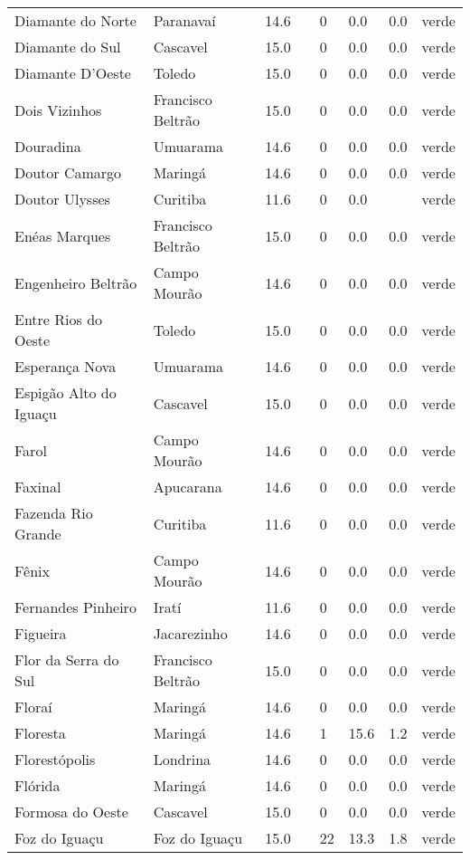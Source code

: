 \begin{longtable}{l|lllllll}
  Diamante do Norte & Paranavaí & 14.6 &  & 0 & 0.0 & 0.0 & verde \\ 
  Diamante do Sul & Cascavel & 15.0 &  & 0 & 0.0 & 0.0 & verde \\ 
  Diamante D'Oeste & Toledo & 15.0 &  & 0 & 0.0 & 0.0 & verde \\ 
  Dois Vizinhos & Francisco Beltrão & 15.0 &  & 0 & 0.0 & 0.0 & verde \\ 
  Douradina & Umuarama & 14.6 &  & 0 & 0.0 & 0.0 & verde \\ 
  Doutor Camargo & Maringá & 14.6 &  & 0 & 0.0 & 0.0 & verde \\ 
  Doutor Ulysses & Curitiba & 11.6 &  & 0 & 0.0 &  & verde \\ 
  Enéas Marques & Francisco Beltrão & 15.0 &  & 0 & 0.0 & 0.0 & verde \\ 
  Engenheiro Beltrão & Campo Mourão & 14.6 &  & 0 & 0.0 & 0.0 & verde \\ 
  Entre Rios do Oeste & Toledo & 15.0 &  & 0 & 0.0 & 0.0 & verde \\ 
  Esperança Nova & Umuarama & 14.6 &  & 0 & 0.0 & 0.0 & verde \\ 
  Espigão Alto do Iguaçu & Cascavel & 15.0 &  & 0 & 0.0 & 0.0 & verde \\ 
  Farol & Campo Mourão & 14.6 &  & 0 & 0.0 & 0.0 & verde \\ 
  Faxinal & Apucarana & 14.6 &  & 0 & 0.0 & 0.0 & verde \\ 
  Fazenda Rio Grande & Curitiba & 11.6 &  & 0 & 0.0 & 0.0 & verde \\ 
  Fênix & Campo Mourão & 14.6 &  & 0 & 0.0 & 0.0 & verde \\ 
  Fernandes Pinheiro & Iratí & 11.6 &  & 0 & 0.0 & 0.0 & verde \\ 
  Figueira & Jacarezinho & 14.6 &  & 0 & 0.0 & 0.0 & verde \\ 
  Flor da Serra do Sul & Francisco Beltrão & 15.0 &  & 0 & 0.0 & 0.0 & verde \\ 
  Floraí & Maringá & 14.6 &  & 0 & 0.0 & 0.0 & verde \\ 
  Floresta & Maringá & 14.6 &  & 1 & 15.6 & 1.2 & verde \\ 
  Florestópolis & Londrina & 14.6 &  & 0 & 0.0 & 0.0 & verde \\ 
  Flórida & Maringá & 14.6 &  & 0 & 0.0 & 0.0 & verde \\ 
  Formosa do Oeste & Cascavel & 15.0 &  & 0 & 0.0 & 0.0 & verde \\ 
  Foz do Iguaçu & Foz do Iguaçu & 15.0 &  & 22 & 13.3 & 1.8 & verde \\ 

\end{longtable}
